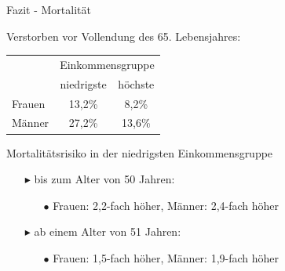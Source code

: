 \documentclass{beamer}
\begin{document}
\begin{frame}{Fazit - Mortalität}
	\begin{block}{Verstorben vor Vollendung des 65. Lebensjahres:}	
\hspace{3cm}		
		\begin{tabular}{lcc}
			\midrule
			 & \multicolumn{2}{c}{Einkommensgruppe}\\
			 & niedrigste  & höchste \\
			\toprule
			Frauen & 13,2\%  & 8,2\% \\
			Männer & 27,2\%  & 13,6\%  \\
		\bottomrule	
		\end{tabular}
	\end{block}
	\pause
	\begin{block}{Mortalitätsrisiko in der niedrigsten Einkommensgruppe}
		\begin{itemize}
			\item[$\blacktriangleright$] bis zum Alter von 50 Jahren:
			\begin{itemize}
				\item[$\bullet$] Frauen: 2,2-fach höher, Männer: 2,4-fach höher
			\end{itemize}
			\item[$\blacktriangleright$] ab einem Alter von 51 Jahren:
			\begin{itemize}
				\item[$\bullet$] Frauen: 1,5-fach höher, Männer: 1,9-fach höher 
			\end{itemize}
		\end{itemize}
	\end{block}
\end{frame}
\end{document}
